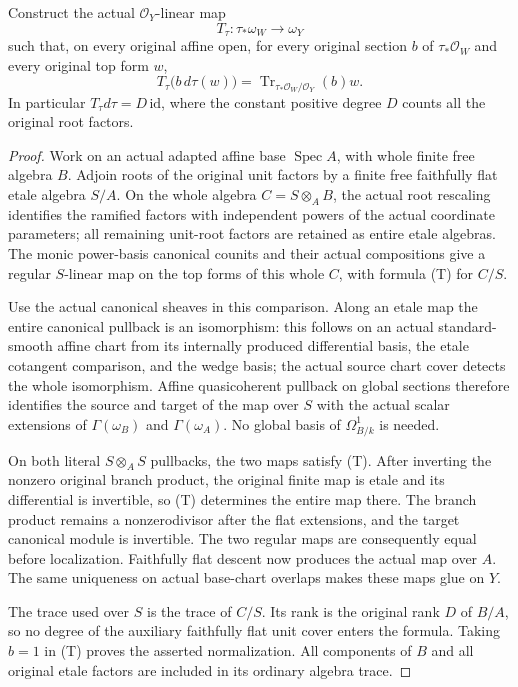\begin{lemma}
\label{lem:kn-nadel-whole-canonical-trace}
\notready
Construct the actual $\mathcal O_Y$-linear map
\[
 T_\tau:\tau_*\omega_W\longrightarrow\omega_Y
\]
such that, on every original affine open, for every original section $b$
of $\tau_*\mathcal O_W$ and every original top form $w$,
\[
 T_\tau\bigl(b\,d\tau(w)\bigr)=\operatorname{Tr}_{\tau_*\mathcal O_W/\mathcal O_Y}(b)w.
 \tag{T}
\]
In particular $T_\tau d\tau=D\,\mathrm{id}$, where the constant positive
degree $D$ counts all the original root factors.
\end{lemma}
\begin{proof}
Work on an actual adapted affine base $\operatorname{Spec}A$, with whole
finite free algebra $B$.  Adjoin roots of the original unit factors by a
finite free faithfully flat etale algebra $S/A$.  On the whole algebra
$C=S\otimes_A B$, the actual root rescaling identifies the ramified
factors with independent powers of the actual coordinate parameters;
all remaining unit-root factors are retained as entire etale algebras.
The monic power-basis canonical counits and their actual compositions
give a regular $S$-linear map on the top forms of this whole $C$, with
formula (T) for $C/S$.

Use the actual canonical sheaves in this comparison.  Along an etale map
the entire canonical pullback is an isomorphism: this follows on an
actual standard-smooth affine chart from its internally produced
differential basis, the etale cotangent comparison, and the wedge basis;
the actual source chart cover detects the whole isomorphism.  Affine
quasicoherent pullback on global sections therefore identifies the
source and target of the map over $S$ with the actual scalar extensions
of $\Gamma(\omega_B)$ and $\Gamma(\omega_A)$.  No global basis of
$\Omega^1_{B/k}$ is needed.

On both literal $S\otimes_A S$ pullbacks, the two maps satisfy (T).
After inverting the nonzero original branch product, the original
finite map is etale and its differential is invertible, so (T)
determines the entire map there.  The branch product remains a
nonzerodivisor after the flat extensions, and the target canonical
module is invertible.  The two regular maps are consequently equal
before localization.  Faithfully flat descent now produces the actual
map over $A$.  The same uniqueness on actual base-chart overlaps makes
these maps glue on $Y$.

The trace used over $S$ is the trace of $C/S$.  Its rank is the original
rank $D$ of $B/A$, so no degree of the auxiliary faithfully flat unit
cover enters the formula.  Taking $b=1$ in (T) proves the asserted
normalization.  All components of $B$ and all original etale factors
are included in its ordinary algebra trace.
\end{proof}

